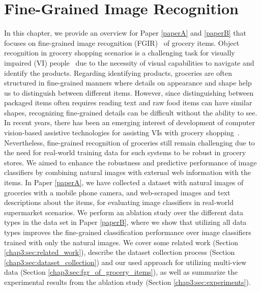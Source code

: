
\chapter{Fine-Grained Image Recognition}\label{chap3}

In this chapter, we provide an overview for Paper \ref{paperA} and \ref{paperB} that focuses on fine-grained image recognition (FGIR)~\cite{wei2021fine} of grocery items. 
Object recognition in grocery shopping scenarios is a challenging task for visually impaired (VI) people~\cite{brady2013visual,cimarolli2012challenges,szpiro2016finding} due to the necessity of visual capabilities to navigate and identify the products. Regarding identifying products, groceries are often structured in fine-grained manners where details on appearance and shape help us to distinguish between different items. However, since distinguishing between packaged items often requires reading text and raw food items can have similar shapes, recognizing fine-grained details can be difficult without the ability to see. 
In recent years, there has been an emerging interest of development of computer vision-based assistive technologies for assisting VIs with grocery shopping~\cite{jafri2014computer,lanigan2006trinetra,winlock2010toward,sosa2017hands,boldu2020aisee,zientara2017third,george2015fine}. Nevertheless, fine-grained recognition of groceries still remain challenging due to the need for real-world training data for such systems to be robust in grocery stores. We aimed to enhance the robustness and predictive performance of image classifiers by combining natural images with external web information with the items. In Paper \ref{paperA}, we have collected a dataset with natural images of groceries with a mobile phone camera, and web-scraped images and text descriptions about the items, for evaluating image classifiers in real-world supermarket scenarios. We perform an ablation study over the different data types in the data set in Paper \ref{paperB}, where we show that utilizing all data types improves the fine-grained classification performance over image classifiers trained with only the natural images. We cover some related work (Section \ref{chap3:sec:related_work}), describe the dataset collection process (Section \ref{chap3:sec:dataset_collection}) and our used approach for utilizing multi-view data (Section \ref{chap3:sec:fgr_of_grocery_items}), as well as summarize the experimental results from the ablation study (Section \ref{chap3:sec:experiments}). 


